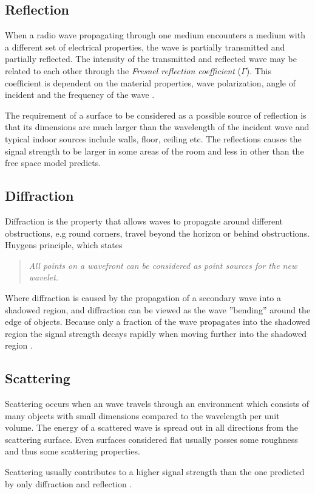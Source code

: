 \documentclass{LTHthesis}
\begin{document}
\subsection{Reflection}
%
When a radio wave propagating through one medium encounters a medium with a different set of electrical properties, the wave is partially transmitted and partially reflected. The intensity of the transmitted and reflected wave may be related to each other through the \emph{Fresnel reflection coefficient} ($\Gamma$). This coefficient is dependent on the material properties, wave polarization, angle of incident and the frequency of the wave \cite{rappaport96}.

The requirement of a surface to be considered as a possible source of reflection is that its dimensions are much larger than the wavelength of the incident wave and typical indoor sources include walls, floor, ceiling etc. The reflections causes the signal strength to be larger in some areas of the room and less in other than the free space model predicts.
%
\subsection{Diffraction}
%
Diffraction is the property that allows waves to propagate around different obstructions, e.g round corners, travel beyond the horizon or behind obstructions. Huygens principle, which states 
\begin{quote}
 \emph{All points on a wavefront can be considered as point sources for the new wavelet.} \cite{rappaport96}
 \end{quote}
%
Where diffraction is caused by the propagation of a secondary wave into a shadowed region, and diffraction can be viewed as the wave ''bending'' around the edge of objects. Because only a fraction of the wave propagates into the shadowed region the signal strength decays rapidly when moving further into the shadowed region \cite{rappaport96}.
%
\subsection{Scattering}
%
Scattering occurs when an wave travels through an environment which consists of many objects with small dimensions compared to the wavelength per unit volume. The energy of a scattered wave is spread out in all directions from the scattering surface. Even surfaces considered flat usually posses some roughness and thus some scattering properties. 

Scattering usually contributes to a higher signal strength than the one predicted by only diffraction and reflection \cite{rappaport96}.
%
\end{document}
